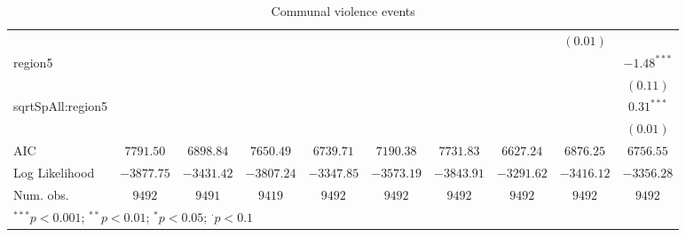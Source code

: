 \begin{sidewaystable}
\begin{center}
{\begin{tabular}{l c c c c c c c c c}
                  &               &               &               &               &               &               &               & $(0.01)$      &               \\
region5           &               &               &               &               &               &               &               &               & $-1.48^{***}$ \\
                  &               &               &               &               &               &               &               &               & $(0.11)$      \\
sqrtSpAll:region5 &               &               &               &               &               &               &               &               & $0.31^{***}$  \\
                  &               &               &               &               &               &               &               &               & $(0.01)$      \\
\midrule
AIC               & $7791.50$     & $6898.84$     & $7650.49$     & $6739.71$     & $7190.38$     & $7731.83$     & $6627.24$     & $6876.25$     & $6756.55$     \\
Log Likelihood    & $-3877.75$    & $-3431.42$    & $-3807.24$    & $-3347.85$    & $-3573.19$    & $-3843.91$    & $-3291.62$    & $-3416.12$    & $-3356.28$    \\
Num. obs.         & $9492$        & $9491$        & $9419$        & $9492$        & $9492$        & $9492$        & $9492$        & $9492$        & $9492$        \\
\bottomrule
\multicolumn{10}{l}{\scriptsize{$^{***}p<0.001$; $^{**}p<0.01$; $^{*}p<0.05$; $^{\cdot}p<0.1$}}
\end{tabular}
}
\caption{Communal violence events}
\label{zorg3}
\end{center}
\end{sidewaystable}

